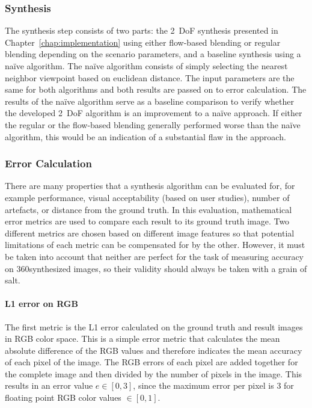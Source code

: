 \subsubsection{Synthesis}
The synthesis step consists of two parts: the 2~DoF synthesis presented in Chapter~\ref{chap:implementation} using either flow-based blending or regular blending depending on the scenario parameters, and a baseline synthesis using a na\"ive algorithm.
The na\"ive algorithm consists of simply selecting the nearest neighbor viewpoint based on euclidean distance. The input parameters are the same for both algorithms and both results are passed on to error calculation.
The results of the na\"ive algorithm serve as a baseline comparison to verify whether the developed 2~DoF algorithm is an improvement to a na\"ive approach. If either the regular or the flow-based blending generally performed worse than the na\"ive algorithm, this would be an indication of a substantial flaw in the approach.

\subsubsection{Error Calculation}
There are many properties that a synthesis algorithm can be evaluated for, for example performance, visual acceptability (based on user studies), number of artefacts, or distance from the ground truth. In this evaluation, mathematical
error metrics are used to compare each result to its ground truth image.  Two different metrics are chosen based on different image features so that potential limitations of each metric can be compensated for by the other. However, it must be taken into account that neither are perfect for the task of measuring accuracy on 360\degree synthesized images, so their validity should always be taken with a grain of salt. 

\paragraph{L1 error on RGB}
The first metric is the L1 error calculated on the ground truth and result images in RGB color space. This is a simple error metric that calculates the mean absolute difference of the RGB values and therefore indicates the mean accuracy of each pixel of the image. The RGB errors of each pixel are added together for the complete image and then divided by the number of pixels in the image. This results in an error value $e \in [0,3]$, since the maximum error per pixel is 3 for floating point RGB color values $\in [0,1]$.

